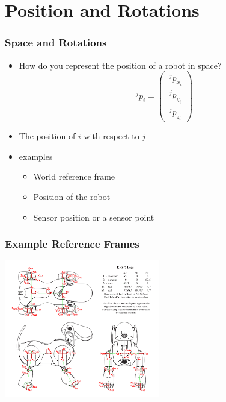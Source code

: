 \documentclass[10pt]{beamer}
\begin{document}
  
\section{Position and Rotations}

\begin{frame}
  \frametitle{Space and Rotations}
  \begin{itemize}
  \item How do you represent the position of a robot in space?
    \pause 
    \begin{equation*}
      ~^{j}p_{i} = \left( \begin{array}{c} ~^{j}p_{x_i} \\ ~^{j}p_{y_i} \\ ~^{j}p_{z_i}  \end{array} \right)
    \end{equation*}
  \item The position of $i$ with respect to $j$
  \item examples
    \begin{itemize}
    \item World reference frame
    \item Position of the robot
    \item Sensor position or a sensor point
    \end{itemize}
  \end{itemize}
\end{frame}

\begin{frame}
  \frametitle{Example Reference Frames}
  \centerline{\includegraphics[height=6cm]{sony-trfs}}
\end{frame}
  
\end{document}
